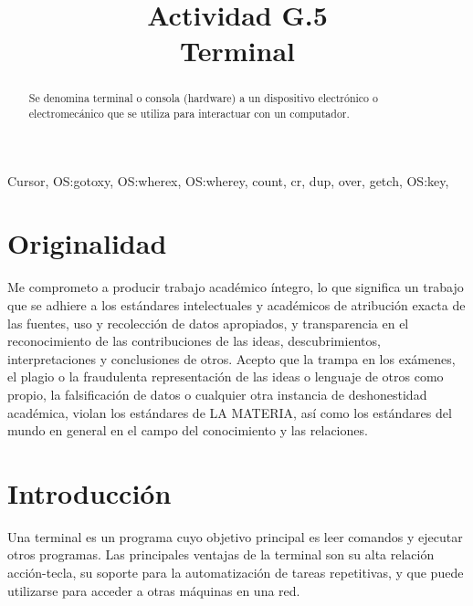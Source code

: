 \documentclass[conference]{IEEEtran}
\begin{document}
\title{Actividad G.5 \\ Terminal
}

\author{
}
\onecolumn

\maketitle

\begin{abstract}
Se denomina terminal o consola (hardware) a un dispositivo electrónico o electromecánico que se utiliza para interactuar con un computador.
\end{abstract}

\begin{IEEEkeywords}
\begin{center}
Cursor, OS:gotoxy, OS:wherex, OS:wherey, count, cr, dup, over, getch, OS:key, 
\end{center}
\end{IEEEkeywords}

\section{Originalidad}
Me comprometo a producir trabajo académico íntegro, lo que significa un trabajo que se adhiere a los estándares intelectuales y académicos de atribución exacta de las fuentes, uso y recolección de datos apropiados, y transparencia en el reconocimiento de las contribuciones de las ideas, descubrimientos, interpretaciones y conclusiones de otros.
Acepto que la trampa en los exámenes, el plagio o la fraudulenta representación de las ideas o lenguaje de otros como propio, la falsificación de datos o cualquier otra instancia de deshonestidad académica, violan los estándares de LA MATERIA, así como los estándares del mundo en general en el campo del conocimiento y las relaciones.

\section{Introducción}
\begin{center}
Una terminal es un programa cuyo objetivo principal es leer comandos y ejecutar otros programas. Las principales ventajas de la terminal son su alta relación acción-tecla, su soporte para la automatización de tareas repetitivas, y que puede utilizarse para acceder a otras máquinas en una red.

\end{center}
\end{document}
